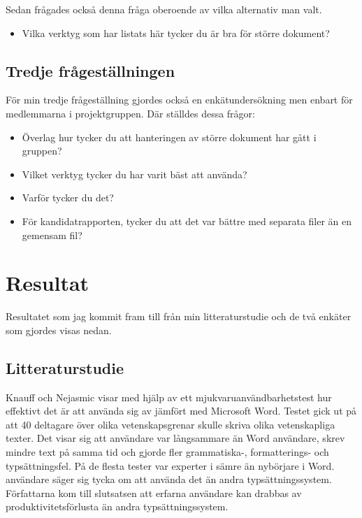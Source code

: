 Sedan frågades också denna fråga oberoende av vilka alternativ man valt.
\begin{itemize}
	\item Vilka verktyg som har listats här tycker du är bra för större dokument?
\end{itemize}

\subsection{Tredje frågeställningen}

För min tredje frågeställning gjordes också en enkätundersökning men enbart för medlemmarna i projektgruppen. Där ställdes dessa frågor:
\begin{itemize}
	\item Överlag hur tycker du att hanteringen av större dokument har gått i gruppen?
	\item Vilket verktyg tycker du har varit bäst att använda?
	\item Varför tycker du det?
	\item För kandidatrapporten, tycker du att det var bättre med separata filer än en gemensam fil?
\end{itemize}

\section{Resultat}
\label{sec:results-tuhkala}
Resultatet som jag kommit fram till från min litteraturstudie och de två enkäter som gjordes visas nedan.

\subsection{Litteraturstudie}
Knauff och Nejasmic \cite{knauff2014efficiency} visar med hjälp av ett mjukvaruanvändbarhetstest hur effektivt det är att använda sig av \latex jämfört med Microsoft Word. Testet gick ut på att 40 deltagare över olika vetenskapsgrenar skulle skriva olika vetenskapliga texter.
Det visar sig att \latex användare var långsammare än Word användare, skrev mindre text på samma tid och gjorde fler grammatiska-, formatterings- och typsättningsfel. På de flesta tester var experter i \latex sämre än nybörjare i Word. \latex användare säger sig tycka om att använda det än andra typsättningssystem. Författarna kom till slutsatsen att erfarna \latex användare kan drabbas av produktivitetsförlusta än andra typsättningssystem.

